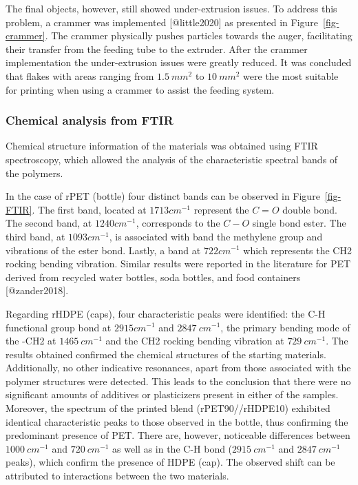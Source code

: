 \documentclass[
  letterpaper,
  DIV=11,
  numbers=noendperiod]{scrartcl}
\begin{document}
The final objects, however, still showed under-extrusion issues. To
address this problem, a crammer was implemented {[}@little2020{]} as
presented in Figure~\ref{fig-crammer}. The crammer physically pushes
particles towards the auger, facilitating their transfer from the
feeding tube to the extruder. After the crammer implementation the
under-extrusion issues were greatly reduced. It was concluded that
flakes with areas ranging from \(1.5~mm^{2}\) to \(10~mm^{2}\) were the
most suitable for printing when using a crammer to assist the feeding
system.

\hypertarget{chemical-analysis-from-ftir}{%
\subsubsection{Chemical analysis from
FTIR}\label{chemical-analysis-from-ftir}}

Chemical structure information of the materials was obtained using FTIR
spectroscopy, which allowed the analysis of the characteristic spectral
bands of the polymers.

In the case of rPET (bottle) four distinct bands can be observed in
Figure~\ref{fig-FTIR}. The first band, located at \(1713 cm^{-1}\)
represent the \(C=O\) double bond. The second band, at \(1240 cm^{-1}\),
corresponds to the \(C-O\) single bond ester. The third band, at
\(1093 cm^{-1}\), is associated with band the methylene group and
vibrations of the ester bond. Lastly, a band at \(722 cm^{-1}\) which
represents the CH2 rocking bending vibration. Similar results were
reported in the literature for PET derived from recycled water bottles,
soda bottles, and food containers {[}@zander2018{]}.

Regarding rHDPE (caps), four characteristic peaks were identified: the
C-H functional group bond at \(2915cm^{-1}\) and \(2847~cm^{-1}\), the
primary bending mode of the -CH2 at \(1465~cm^{-1}\) and the CH2 rocking
bending vibration at \(729 ~cm^{-1}\). The results obtained confirmed
the chemical structures of the starting materials. Additionally, no
other indicative resonances, apart from those associated with the
polymer structures were detected. This leads to the conclusion that
there were no significant amounts of additives or plasticizers present
in either of the samples. Moreover, the spectrum of the printed blend
(rPET90//rHDPE10) exhibited identical characteristic peaks to those
observed in the bottle, thus confirming the predominant presence of PET.
There are, however, noticeable differences between \(1000 ~cm^{-1}\) and
\(720 ~cm^{-1}\) as well as in the C-H bond (\(2915~cm^{-1}\) and
\(2847 ~cm^{-1}\) peaks), which confirm the presence of HDPE (cap). The
observed shift can be attributed to interactions between the two
materials.
\end{document}
